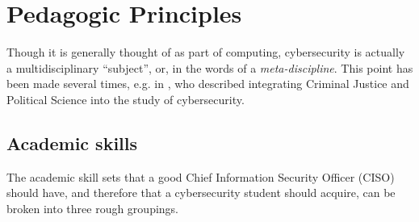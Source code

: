 \documentclass[conference]{IEEEtran}
\begin{document}
\section{Pedagogic Principles}

Though it is generally thought of as part of computing, cybersecurity is actually a multidisciplinary ``subject'', or, in the words of \cite{Parrishetal2018a} a \emph{meta-discipline}. This point has been made several times, e.g.  in \cite{Stockman2013}, who described integrating Criminal Justice and Political Science into the study of cybersecurity.  
\subsection{Academic skills}\label{sec:academic}
The academic skill sets that a good Chief Information Security Officer (CISO) should have, and therefore that a cybersecurity student should acquire, can be broken into three rough groupings.
\end{document}
